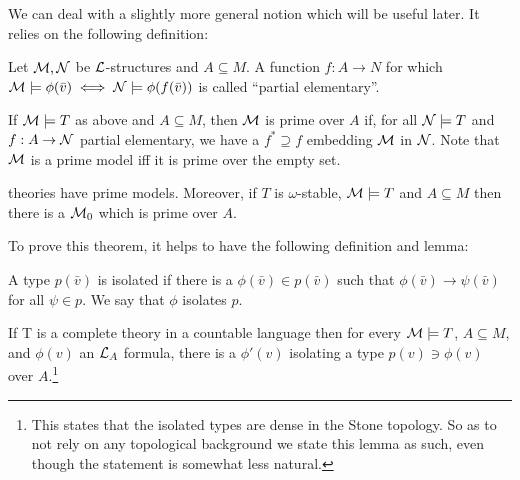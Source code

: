 We can deal with a slightly more general notion which will be useful later. 
It relies on the following definition:

\begin{definition}\label{definition_partial_elementary}
Let \(\mathcal{M}, \mathcal{N}\) be \(\mathcal{L}\)-structures and \(A \subseteq M\).
A function \(f:A \to N\) for which \(\mathcal{M} \models \phi(\bar{v}) \iff \mathcal{N} \models \phi(f(\bar{v}))\) is called ``partial elementary''.
\end{definition}

\begin{definition}\label{definition_prime_over}
If \(\mathcal{M} \models T\) as above and \(A \subseteq M\), then \(\mathcal{M}\) is prime over \(A\) if, for all \(\mathcal{N} \models T\) and \(f:A \to \mathcal{N}\) partial elementary, we have a \(f^* \supseteq f\) embedding \(\mathcal{M}\) in \(\mathcal{N}\). 
Note that \(\mathcal{M}\) is a prime model iff it is prime over the empty set.
\end{definition}

\begin{theorem}\label{thm_omst_prime}
\omst theories have prime models. Moreover, if \(T\) is \(\omega\)-stable, \(\mathcal{M} \models T\) and \(A \subseteq M\) then there is a \(\mathcal{M}_0\) which is prime over \(A\). 
\end{theorem}

\noindent To prove this theorem, it helps to have the following definition and lemma:
\begin{definition}\label{definition_isolated_types}
A type \(p(\bar{v})\) is isolated if there is a \(\phi(\bar{v}) \in p(\bar{v})\) such that \(\phi(\bar{v}) \to \psi(\bar{v})\) for all \(\psi \in p\). We say that \(\phi\) isolates \(p\). %
\end{definition}

\begin{lemma}\label{isolated_types_are_dense}
If T is a complete \omst theory in a countable language then for every \(\mathcal{M} \models T\), \(A \subseteq M\), and \(\phi(v)\) an \(\mathcal{L}_A\) formula, there is a \(\phi'(v)\) isolating a type \(p(v) \ni \phi(v)\) over \(A\).\footnote{This states that the isolated types are dense in the Stone topology. So as to not rely on any topological background we state this lemma as such, even though the statement is somewhat less natural.}
\end{lemma}

